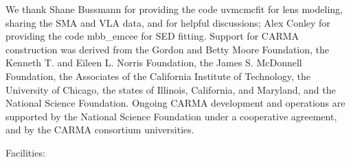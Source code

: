 \documentclass[iop]{emulateapj}
\begin{document}
\acknowledgments
We thank Shane Bussmann for providing the code {\sc uvmcmcfit} for lens modeling, sharing the SMA and VLA data, and for helpful discussions; Alex Conley for providing the code {\sc mbb\_emcee} for SED fitting. 
Support for CARMA construction was derived from the
Gordon and Betty Moore Foundation, the Kenneth T. and Eileen
L. Norris Foundation, the James S. McDonnell Foundation, the
Associates of the California Institute of Technology, the University
of Chicago, the states of Illinois, California, and Maryland,
and the National Science Foundation. 
Ongoing CARMA development
and operations are supported by the National Science
Foundation under a cooperative agreement, and by the CARMA
consortium universities.

Facilities: 
\end{document}
